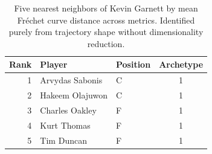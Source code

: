 \begin{table}[htbp]
  \centering\small
  \begin{tabular}{rllc}
    \toprule
    Rank & Player & Position & Archetype \\
    \midrule
    1 & Arvydas Sabonis & C & 1 \\
    2 & Hakeem Olajuwon & C & 1 \\
    3 & Charles Oakley & F & 1 \\
    4 & Kurt Thomas & F & 1 \\
    5 & Tim Duncan & F & 1 \\
    \bottomrule
  \end{tabular}
  \caption{Five nearest neighbors of Kevin Garnett by mean Fr\'{e}chet curve distance across metrics. Identified purely from trajectory shape without dimensionality reduction.}
  \label{tab:Kevin_Garnett_frechet_curve_neighbors}
\end{table}

